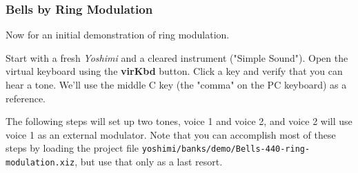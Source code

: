 \subsubsection{Bells by Ring Modulation}
\label{subsec:cookbook_instruments_bells_by_ring}


   Now for an initial demonstration of ring modulation.

   Start with a fresh \textsl{Yoshimi} and a cleared instrument ("Simple
   Sound").  Open the virtual keyboard using the \textbf{virKbd} button.
   Click a key and verify that you can hear a tone.  We'll use the middle C
   key (the "comma" on the PC keyboard) as a reference.

   The following steps will set up two tones, voice 1 and voice 2, and voice
   2 will use voice 1 as an external modulator.
   Note that you can accomplish most of these steps by loading the project
   file \texttt{yoshimi/banks/demo/Bells-440-ring-modulation.xiz}, but use
   that only as a last resort.

